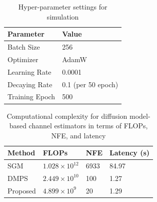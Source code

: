 \documentclass[lettersize,journal]{IEEEtran}
\begin{document}
\begin{table}[!t]
\begin{center}
  \renewcommand{\arraystretch}{1.1} 
\caption{Hyper-parameter settings for simulation\label{tab:table1}}
\label{tab1}
\begin{tabular}{M{0.19\columnwidth}|M{0.3\columnwidth}}
\hline
\textbf{Parameter} & \textbf{Value} \\
\hline
Batch Size & 256 \\
\hline
Optimizer & AdamW \\
\hline
Learning Rate & 0.0001 \\
\hline
Decaying Rate & 0.1 (per 50 epoch) \\
\hline
Training Epoch & 500 \\
\hline
\end{tabular}
\end{center}
\end{table}

\begin{table}[!t]
\centering
\renewcommand{\arraystretch}{1.1} 
\caption{Computational complexity for diffusion model-based channel estimators in terms of FLOPs, NFE, and latency}
\label{tab:table2}
\begin{tabular}{M{0.20\columnwidth}|M{0.21\columnwidth}|M{0.20\columnwidth}|M{0.20\columnwidth}}
\hline
\textbf{Method} & \textbf{FLOPs} & \textbf{NFE} & \textbf{Latency (s)} \\
\hline
SGM\cite{arvinteMIMOChannelEstimation2023} & \(1.028 \times 10^{12}\) & 6933 & 84.97 \\
\hline
DMPS\cite{zhouGenerativeDiffusionModels2025} & \(2.449 \times 10^{10}\) & 100 & 1.27 \\
\hline
Proposed & \(4.899 \times 10^9\) & 20 & 1.29 \\
\hline
\end{tabular}
\end{table}
\end{document}
